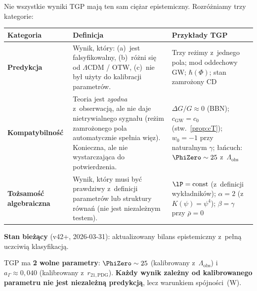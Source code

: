 \begin{remark}\label{rem:honest-classification}
Nie wszystkie wyniki TGP maj\k{a} ten sam ci\k{e}\.zar
epistemiczny. Rozr\'o\.zniamy trzy kategorie:

\medskip
\begin{center}\small
\begin{tabular}{@{}lp{7.5cm}p{3.5cm}@{}}
\toprule
\textbf{Kategoria} & \textbf{Definicja} & \textbf{Przyk\l{}ady TGP} \\
\midrule
\textbf{Predykcja} &
  Wynik, kt\'ory: (a)~jest falsyfikowalny, (b)~r\'o\.zni si\k{e}
  od $\Lambda$CDM / OTW, (c)~nie by\l{} u\.zyty
  do kalibracji parametr\'ow.
& Trzy re\.zimy z~jednego pola; mod oddechowy GW;
  $\hbar(\Phi)$; stan zamro\.zony CD \\[4pt]
\textbf{Kompatybilno\'s\'c} &
  Teoria jest \emph{zgodna} z~obserwacj\k{a}, ale nie
  daje nietrywialnego sygna\l{}u (re\.zim zamro\.zonego
  pola automatycznie spe\l{}nia wi\k{e}z). Konieczna,
  ale nie wystarczaj\k{a}ca do potwierdzenia.
& $\Delta G/G \approx 0$ (BBN); $c_{\mathrm{GW}} = c_0$ (stw.~\ref{prop:cT});
  $w_0 = -1$ przy naturalnym $\gamma$;
  \l{}a\'ncuch: $\PhiZero \sim 25$ z~$\Lambda_{\mathrm{obs}}$ \\[4pt]
\textbf{To\.zsamo\'s\'c algebraiczna} &
  Wynik, kt\'ory musi by\'c prawdziwy z~definicji
  parametr\'ow lub struktury r\'owna\'n (nie jest
  niezale\.znym testem).
& $\lP = \mathrm{const}$ (z~definicji wyk\l{}adnik\'ow);
  $\alpha = 2$ (z~$K(\psi)=\psi^4$);
  $\beta = \gamma$ przy $\bar\rho = 0$ \\
\bottomrule
\end{tabular}
\end{center}

\medskip\noindent
\textbf{Stan bie\.z\k{a}cy} (v42+, 2026-03-31): aktualizowany bilans
epistemiczny z~pe\l{}n\k{a} uczciwi\k{a} klasyfikacj\k{a}.

TGP ma \textbf{2 wolne parametry}: $\PhiZero \sim 25$
(kalibrowany z~$\Lambda_{\mathrm{obs}}$) i~$a_\Gamma \approx 0{,}040$
(kalibrowany z~$r_{21,\mathrm{PDG}}$).
\textbf{Ka\.zdy wynik zale\.zny od kalibrowanego parametru
nie jest niezale\.zn\k{a} predykcj\k{a}}, lecz warunkiem
sp\'ojno\'sci~(W).


\end{remark}
